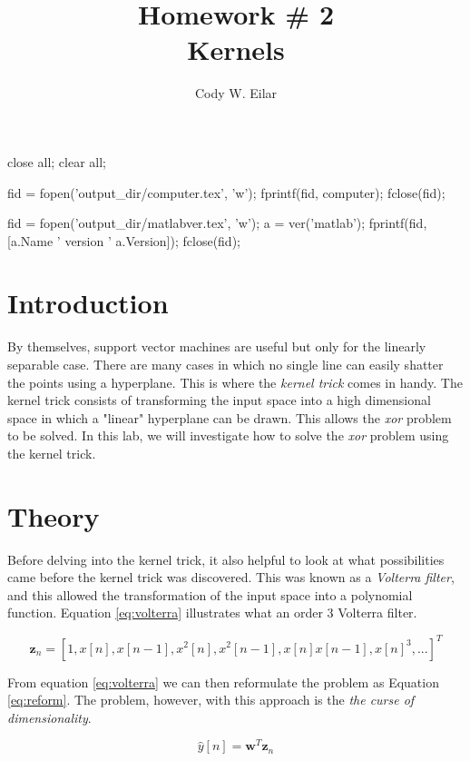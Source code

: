 \documentclass[11pt, twoside]{article}   	%
\title{Homework \# 2 \\ Kernels}
\author{Cody W. Eilar}
\newenvironment{matlab}{\comment}{\endcomment}
\begin{document}
\maketitle


\begin{matlab}
close all; 
clear all;

fid = fopen('output_dir/computer.tex', 'w'); 
fprintf(fid, computer); 
fclose(fid); 

fid = fopen('output_dir/matlabver.tex', 'w'); 
a = ver('matlab'); 
fprintf(fid, [a.Name ' version ' a.Version]); 
fclose(fid); 
\end{matlab}
\section{Introduction} 
By themselves, support vector machines are useful but only for the linearly separable case. There are many cases in which no single line can easily shatter the points 
using a hyperplane. This is where the \textit{kernel trick} comes in handy. The kernel trick consists of transforming the input space into a high dimensional space in which a "linear"
hyperplane can be drawn. This allows the \textit{xor} problem to be solved. In this lab, we will investigate how to solve the \textit{xor} problem using the kernel trick. 

\section{Theory}
Before delving into the kernel trick, it also helpful to look at what possibilities came before the kernel trick was discovered. This was known as a \textit{Volterra filter}, and this allowed
the transformation of the input space into a polynomial function. Equation \ref{eq:volterra} illustrates what an order 3 Volterra filter.


\begin{equation}
\mathbf{z}_n = [1, x[n], x[n-1], x^2[n], x^2[n-1], x[n] x[n-1], x[n]^3, ...]^T
\label{eq:volterra}
\end{equation}

From equation \ref{eq:volterra} we can then reformulate the problem as Equation \ref{eq:reform}.  The problem, however, with this approach is the \textit{the curse of dimensionality}.

\begin{equation}
\hat{y}[n] = \mathbf{w}^T\mathbf{z}_n
\label{eq:reform}
\end{equation}
\end{document}
